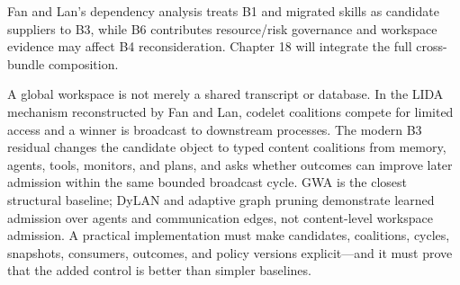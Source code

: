 Fan and Lan's dependency analysis treats B1 and migrated skills as candidate suppliers to B3, while B6 contributes resource/risk governance and workspace evidence may affect B4 reconsideration. Chapter 18 will integrate the full cross-bundle composition.

\begin{chapterrecap}
A global workspace is not merely a shared transcript or database. In the LIDA mechanism reconstructed by Fan and Lan, codelet coalitions compete for limited access and a winner is broadcast to downstream processes. The modern B3 residual changes the candidate object to typed content coalitions from memory, agents, tools, monitors, and plans, and asks whether outcomes can improve later admission within the same bounded broadcast cycle. GWA is the closest structural baseline; DyLAN and adaptive graph pruning demonstrate learned admission over agents and communication edges, not content-level workspace admission. A practical implementation must make candidates, coalitions, cycles, snapshots, consumers, outcomes, and policy versions explicit—and it must prove that the added control is better than simpler baselines.
\end{chapterrecap}

